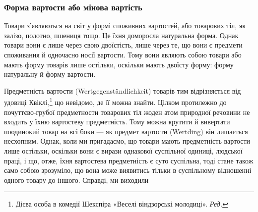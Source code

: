 \subsubsection{Форма вартости або мінова вартість}

Товари з’являються на світ у формі споживних вартостей, або
товарових тіл, як залізо, полотно, пшениця тощо. Це їхня доморосла
натуральна форма. Однак товари вони є лише через свою
двоїстість, лише через те, що вони є предмети споживання й одночасно
носії вартости. Тому вони являють собою товари або мають
форму товарів лише остільки, оскільки мають двоїсту форму:
форму натуральну й форму вартости.

Предметність вартости (Wertgegenständlichkeit) товарів тим
відрізняється від удовиці Квіклі,\footnote*{Дієва особа в комедії
Шекспіра «Веселі віндзорські молодиці».
\emph{Ред.}
} що невідомо, де її можна
знайти. Цілком протилежно до почуттєво-грубої предметности
товарових тіл жоден атом природної речовини не входить у їхню
вартостеву предметність. Тому можна крутити й вивертати поодинокий
товар на всі боки — як предмет вартости (Wertding)
він лишається несхопним. Однак, коли ми пригадаємо, що товари
мають предметність вартости лише остільки, оскільки вони є
вирази однакової суспільної одиниці, людської праці, і що, отже,
їхня вартостева предметність є суто суспільна, тоді стане також
само собою зрозуміло, що вона може виявитись тільки в суспільному
відношенні одного товару до іншого. Справді, ми виходили
\parbreak{}
